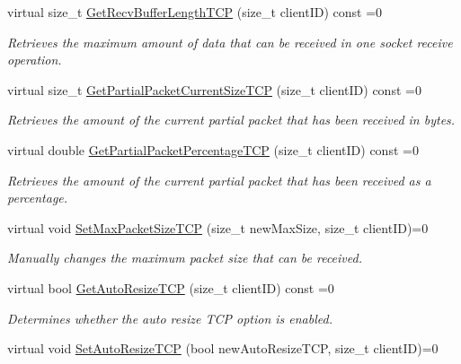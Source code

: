 \begin{DoxyCompactItemize}
virtual size\_\-t \hyperlink{class_net_instance_t_c_p_a8702bf908ad147d94b4351077c9ae599}{GetRecvBufferLengthTCP} (size\_\-t clientID) const =0
\begin{DoxyCompactList}\small\item\em Retrieves the maximum amount of data that can be received in one socket receive operation. \item\end{DoxyCompactList}\item 
virtual size\_\-t \hyperlink{class_net_instance_t_c_p_ab32a5b7813c41e2f7149ef8c8adede38}{GetPartialPacketCurrentSizeTCP} (size\_\-t clientID) const =0
\begin{DoxyCompactList}\small\item\em Retrieves the amount of the current partial packet that has been received in bytes. \item\end{DoxyCompactList}\item 
virtual double \hyperlink{class_net_instance_t_c_p_a2d4a7129fbe74b7f2e562d5e8a1f84cf}{GetPartialPacketPercentageTCP} (size\_\-t clientID) const =0
\begin{DoxyCompactList}\small\item\em Retrieves the amount of the current partial packet that has been received as a percentage. \item\end{DoxyCompactList}\item 
virtual void \hyperlink{class_net_instance_t_c_p_afe39589a67763fc6becc79f39659c3a4}{SetMaxPacketSizeTCP} (size\_\-t newMaxSize, size\_\-t clientID)=0
\begin{DoxyCompactList}\small\item\em Manually changes the maximum packet size that can be received. \item\end{DoxyCompactList}\item 
virtual bool \hyperlink{class_net_instance_t_c_p_a59cf03453fd680e8a2a0dc4395f1f70a}{GetAutoResizeTCP} (size\_\-t clientID) const =0
\begin{DoxyCompactList}\small\item\em Determines whether the auto resize TCP option is enabled. \item\end{DoxyCompactList}\item 
virtual void \hyperlink{class_net_instance_t_c_p_ab9cc381e6561444004d82ea394ccf2fe}{SetAutoResizeTCP} (bool newAutoResizeTCP, size\_\-t clientID)=0

\end{DoxyCompactItemize}
